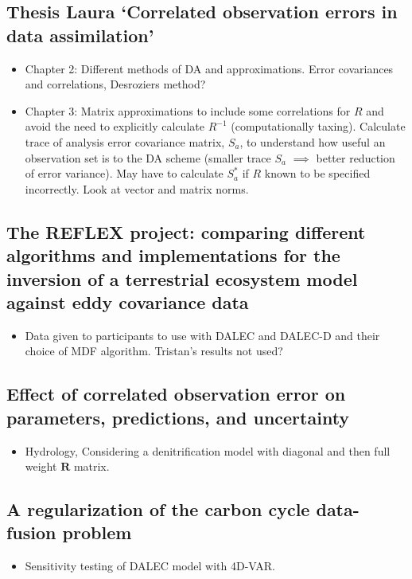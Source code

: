 \documentclass[11pt]{article}
\begin{document}
\subsection*{Thesis Laura `Correlated observation errors in data assimilation' \cite{stewart2008correlated}}
\begin{itemize}
\item Chapter 2: Different methods of DA and approximations. Error covariances and correlations, Desroziers method?
\item Chapter 3: Matrix approximations to include some correlations for $R$ and avoid the need to explicitly calculate $R^{-1}$ (computationally taxing). Calculate trace of analysis error covariance matrix, $S_{a}$, to understand how useful an observation set is to the DA scheme (smaller trace $S_{a}$ $\implies$ better reduction of error variance). May have to calculate $S_{a}^{*}$ if $R$ known to be specified incorrectly. Look at vector and matrix norms.
\end{itemize}


\subsection*{The REFLEX project: comparing different algorithms and implementations for the inversion of a terrestrial ecosystem model against eddy covariance data \cite{fox2009reflex}}
\begin{itemize}
\item Data given to participants to use with DALEC and DALEC-D and their choice of MDF algorithm. Tristan's results not used?
\end{itemize}


\subsection*{Effect of correlated observation error on parameters, predictions, and uncertainty \cite{tiedeman2013effect}}
\begin{itemize}
\item Hydrology, Considering a denitrification model with diagonal and then full weight $\textbf{R}$ matrix.
\end{itemize}


\subsection*{A regularization of the carbon cycle data-fusion problem \cite{delahaies2013regularization}}
\begin{itemize}
\item Sensitivity testing of DALEC model with 4D-VAR. 
\end{itemize}
\end{document}
